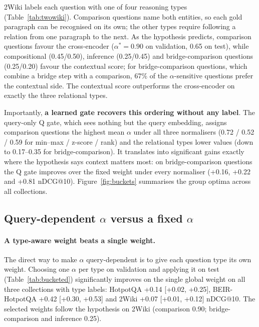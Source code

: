 \documentclass[11pt]{article}
\newcommand{\gate}[1]{\textsc{#1}}
\begin{document}
2Wiki labels each question with one of four reasoning types (Table~\ref{tab:twowiki}). Comparison
questions name both entities, so each gold paragraph can be recognised on its own; the other types
require following a relation from one paragraph to the next. As the hypothesis predicts, comparison
questions favour the cross-encoder ($\alpha^*=0.90$ on validation, 0.65 on test), while compositional
(0.45/0.50), inference (0.25/0.45) and bridge-comparison questions (0.25/0.20) favour the contextual
score; for bridge-comparison questions, which combine a bridge step with a comparison, 67\% of the
$\alpha$-sensitive questions prefer the contextual side. The contextual score outperforms the
cross-encoder on exactly the three relational types.

Importantly, \textbf{a learned gate recovers this ordering without any label}. The query-only \gate{Q}
gate, which sees nothing but the query embedding, assigns comparison questions the highest mean $\alpha$
under all three normalisers (0.72 / 0.52 / 0.59 for min--max / z-score / rank) and the relational types
lower values (down to 0.17--0.35 for bridge-comparison). It translates into significant gains exactly
where the hypothesis says context matters most: on bridge-comparison questions the \gate{Q} gate
improves over the fixed weight under every normaliser (+0.16, +0.22 and +0.81 nDCG@10). Figure~\ref{fig:buckets}
summarises the group optima across all collections.

\subsection{Query-dependent $\alpha$ versus a fixed $\alpha$}
\label{sec:adaptive}





\paragraph{A type-aware weight beats a single weight.}
The direct way to make $\alpha$ query-dependent is to give each question type its own weight. Choosing
one $\alpha$ per type on validation and applying it on test (Table~\ref{tab:bucketed}) significantly
improves on the single global weight on all three collections with type labels: HotpotQA +0.14
[+0.02, +0.25], BEIR-HotpotQA +0.42 [+0.30, +0.53] and 2Wiki +0.07 [+0.01, +0.12] nDCG@10. The
selected weights follow the hypothesis on 2Wiki (comparison 0.90; bridge-comparison and inference 0.25).
\end{document}
